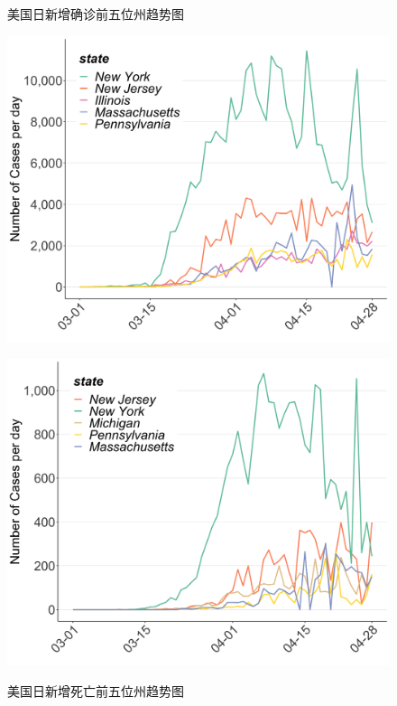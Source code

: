\documentclass[]{article}
\begin{document}
\begin{figure}[H]
\centering
\begin{minipage}[b]{0.48\linewidth}
\caption{美国日新增确诊前五位州趋势图}
\includegraphics[]{./input/covid5.png}
\label{}
\end{minipage}
\quad
\begin{minipage}[b]{0.48\linewidth}
\caption{美国日新增死亡前五位州趋势图}
\includegraphics[]{./input/covid6.png}
\label{}
\end{minipage}
\end{figure}
\end{document}
